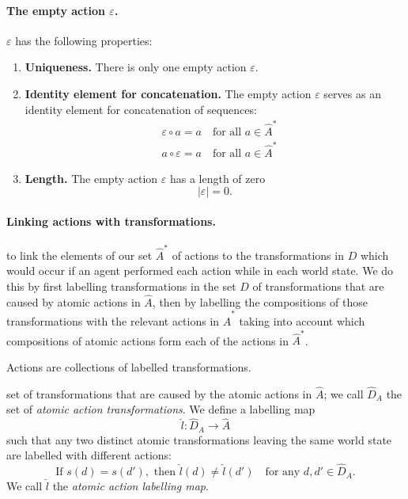 \paragraph{The empty action $\varepsilon$.}
 $\varepsilon$ has the following properties:
\begin{enumerate}
    \item \textbf{Uniqueness.}
    There is only one empty action $\varepsilon$.
    \item \textbf{Identity element for concatenation.}
    The empty action $\varepsilon$ serves as an identity element for concatenation of sequences:
    \begin{align}
        \label{eqn:empty_action_is_left_identity}
        & \varepsilon \circ a = a \quad \text{for all $a \in \hat{A}^{*}$} \\
        \label{eqn:empty_action_is_right_identity}
        & a \circ \varepsilon = a \quad \text{for all $a \in \hat{A}^{*}$}
    \end{align}
    \item \textbf{Length.}
    The empty action $\varepsilon$ has a length of zero
    \begin{equation}
        |\varepsilon| = 0.
    \end{equation}
\end{enumerate}

\paragraph{Linking actions with transformations.}

 to link the elements of our set $\hat{A}^{*}$ of actions to the transformations in $D$ which would occur if an agent performed each action while in each world state.
We do this by first labelling transformations in the set $D$ of transformations that are caused by atomic actions in $\hat{A}$, then by labelling the compositions of those transformations with the relevant actions in $\hat{A}^{*}$ taking into account which compositions of atomic actions form each of the actions in $\hat{A}^{*}$.

\begin{postulate}
	Actions are collections of labelled transformations.
\end{postulate}

 set of transformations that are caused by the atomic actions in $\hat{A}$; we call $\hat{D}_{A}$ the set of \emph{atomic action transformations}.
We define a labelling map
\begin{equation}
    \hat{l}: \hat{D}_{A} \to \hat{A}
\end{equation}
such that any two distinct atomic transformations leaving the same world state are labelled with different actions:
\begin{equation}
  \text{If } s(d) = s(d'), \text{ then } \hat{l}(d) \neq \hat{l}(d') \quad \text{for any } d, d' \in \hat{D}_{A}.
\end{equation}
We call $\hat{l}$ the \emph{atomic action labelling map}.

